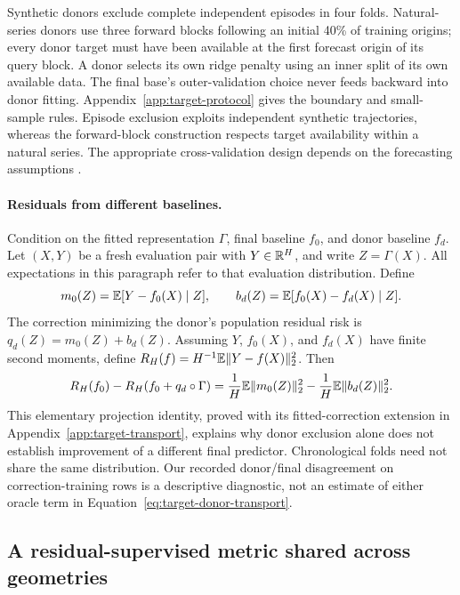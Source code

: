 Synthetic donors exclude complete independent episodes in four folds.
Natural-series donors use three forward blocks following an initial 40\%
of training origins; every donor target must have been available at the
first forecast origin of its query block. A donor selects its own ridge
penalty using an inner split of its own available data. The final base's
outer-validation choice never feeds backward into donor fitting.
Appendix~\ref{app:target-protocol} gives the boundary and small-sample
rules. Episode exclusion exploits independent synthetic trajectories, whereas
the forward-block construction respects target availability within a
natural series. The appropriate cross-validation design depends on
the forecasting assumptions \citep{Bergmeir2018CV}.

\paragraph{Residuals from different baselines.}
Condition on the fitted representation $\Gamma$, final baseline
$f_0$, and donor baseline $f_d$. Let $(X,Y)$ be a fresh evaluation
pair with $Y\in\mathbb{R}^H$, and write $Z=\Gamma(X)$. All expectations
in this paragraph refer to that evaluation distribution. Define
\[
 m_0(Z)=\mathbb{E}[Y-f_0(X)\mid Z],\qquad
 b_d(Z)=\mathbb{E}[f_0(X)-f_d(X)\mid Z].
\]
The correction minimizing the donor's population residual risk is
$q_d(Z)=m_0(Z)+b_d(Z)$. Assuming $Y$, $f_0(X)$, and $f_d(X)$ have
finite second moments, define $R_H(f)=H^{-1}\mathbb{E}\|Y-f(X)\|_2^2$. Then
\begin{equation}
 R_H(f_0)-R_H(f_0+q_d\circ\Gamma)
 =\frac1H\mathbb{E}\|m_0(Z)\|_2^2-\frac1H\mathbb{E}\|b_d(Z)\|_2^2.
 \label{eq:target-donor-transport}
\end{equation}
This elementary projection identity, proved with its fitted-correction
extension in Appendix~\ref{app:target-transport}, explains why donor
exclusion alone does not establish improvement of a different final
predictor. Chronological folds need not share the same distribution. Our recorded
donor/final disagreement on correction-training rows is a descriptive
diagnostic, not an estimate of either oracle term in
Equation~\eqref{eq:target-donor-transport}.

\subsection{A residual-supervised metric shared across geometries}
\label{sec:target-metric}

